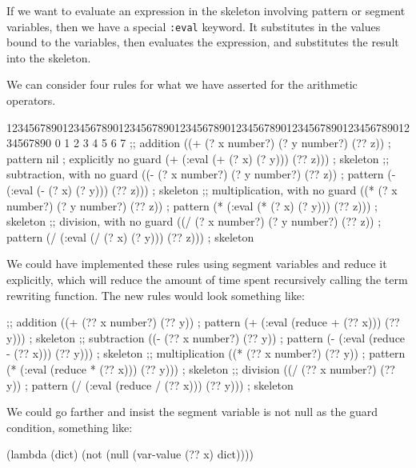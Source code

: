 If we want to evaluate an expression in the skeleton involving pattern
or segment variables, then we have a special \lstinline[language=lisp]{:eval}
keyword. It substitutes in the values bound to the variables, then
evaluates the expression, and substitutes the result into the skeleton.

We can consider four rules for what we have asserted for the arithmetic operators.

\begin{lisp-example}
12345678901234567890123456789012345678901234567890123456789012345678901234567890
         0         1         2         3         4         5         6         7
;; addition
((+ (? x number?) (? y number?) (?? z)) ; pattern
 nil                                    ; explicitly no guard
 (+ (:eval (+ (? x) (? y))) (?? z)))    ; skeleton
;; subtraction, with no guard
((- (? x number?) (? y number?) (?? z)) ; pattern
 (- (:eval (- (? x) (? y))) (?? z)))    ; skeleton
;; multiplication, with no guard
((* (? x number?) (? y number?) (?? z)) ; pattern
 (* (:eval (* (? x) (? y))) (?? z)))    ; skeleton
;; division, with no guard
((/ (? x number?) (? y number?) (?? z)) ; pattern
 (/ (:eval (/ (? x) (? y))) (?? z)))    ; skeleton
\end{lisp-example}

\begin{remark}
We could have implemented these rules using segment variables and reduce
it explicitly, which will reduce the amount of time spent recursively
calling the term rewriting function. The new rules would look something like:
\begin{lisp-example}
;; addition
((+ (?? x number?) (?? y))              ; pattern
 (+ (:eval (reduce + (?? x))) (?? y)))  ; skeleton
;; subtraction
((- (?? x number?) (?? y))              ; pattern
 (- (:eval (reduce - (?? x))) (?? y)))  ; skeleton
;; multiplication
((* (?? x number?) (?? y))              ; pattern
 (* (:eval (reduce * (?? x))) (?? y)))  ; skeleton
;; division
((/ (?? x number?) (?? y))              ; pattern
 (/ (:eval (reduce / (?? x))) (?? y)))  ; skeleton
\end{lisp-example}
We could go farther and insist the segment variable is not null as the
guard condition, something like:
\begin{lisp-example}
(lambda (dict) (not (null (var-value (?? x) dict))))
\end{lisp-example}
\end{remark}

